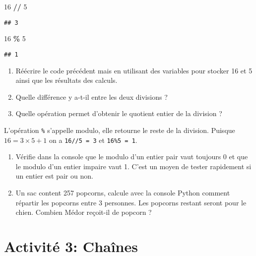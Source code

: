 \documentclass[
]{book}
\newenvironment{Shaded}{\begin{snugshade}}{\end{snugshade}}
\newcommand{\DecValTok}[1]{\textcolor[rgb]{0.00,0.00,0.81}{#1}}
\newcommand{\OperatorTok}[1]{\textcolor[rgb]{0.81,0.36,0.00}{\textbf{#1}}}
\providecommand{\tightlist}{%
  \setlength{\itemsep}{0pt}\setlength{\parskip}{0pt}}
\def\tightlist{}
\begin{document}
\begin{Shaded}
\begin{Highlighting}[]
\DecValTok{16} \OperatorTok{//} \DecValTok{5}
\end{Highlighting}
\end{Shaded}

\begin{verbatim}
## 3
\end{verbatim}

\begin{Shaded}
\begin{Highlighting}[]
\DecValTok{16} \OperatorTok{\%} \DecValTok{5}
\end{Highlighting}
\end{Shaded}

\begin{verbatim}
## 1
\end{verbatim}

\begin{enumerate}
\def\labelenumi{\arabic{enumi}.}
\setcounter{enumi}{1}
\tightlist
\item
  Réécrire le code précédent mais en utilisant des variables pour stocker 16 et 5 ainsi que les résultats des calculs.
\item
  Quelle différence y a-t-il entre les deux divisions ?
\item
  Quelle opération permet d'obtenir le quotient entier de la division ?
\end{enumerate}

L'opération \texttt{\%} s'appelle modulo, elle retourne le reste de la division. Puisque \(16= 3\times 5 + 1\) on a \texttt{16//5\ =\ 3} et \texttt{16\%5\ =\ 1}.

\begin{enumerate}
\def\labelenumi{\arabic{enumi}.}
\setcounter{enumi}{3}
\tightlist
\item
  Vérifie dans la console que le modulo d'un entier pair vaut toujours 0 et que le modulo d'un entier impaire vaut 1. C'est un moyen de tester rapidement si un entier est pair ou non.
\item
  Un sac content 257 popcorns, calcule avec la console Python comment répartir les popcorns entre 3 personnes. Les popcorns restant seront pour le chien. Combien Médor reçoit-il de popcorn ?
\end{enumerate}

\newpage

\hypertarget{activituxe9-3-chauxeenes}{%
\section{Activité 3: Chaînes}\label{activituxe9-3-chauxeenes}}
\end{document}
